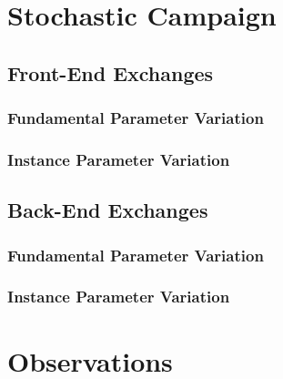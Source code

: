 \section{Stochastic Campaign}

\subsection{Front-End Exchanges}

\subsubsection{Fundamental Parameter Variation}

\subsubsection{Instance Parameter Variation}

\subsection{Back-End Exchanges}

\subsubsection{Fundamental Parameter Variation}

\subsubsection{Instance Parameter Variation}

\section{Observations}
